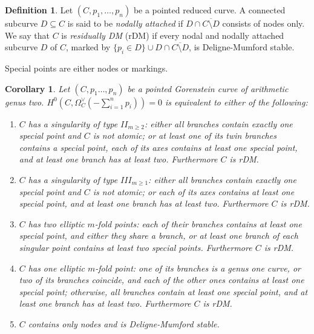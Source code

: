 \documentclass[11pt]{amsart}
\renewcommand{\to}{\rightarrow}
\theoremstyle{plain}
\newtheorem{cor}[thm]{Corollary}
\theoremstyle{definition}
\newtheorem{dfn}[thm]{Definition}
\begin{document}
\begin{dfn}
 Let $(C,p_1,\ldots,p_n)$ be a pointed reduced curve. A connected subcurve $D\subseteq C$ is said to be \emph{nodally attached} if $D\cap\overline{C\setminus D}$ consists of nodes only.
 We say that $C$ is \emph{residually DM} (rDM) if every nodal and nodally attached subcurve $D$ of $C$, marked by $\{p_i\in D\}\cup D\cap\overline{C\setminus D}$, is Deligne-Mumford stable.
\end{dfn}
Special points are either nodes or markings.
\begin{cor}
 Let $(C,p_1\ldots,p_n)$ be a pointed Gorenstein curve of arithmetic genus two. $H^0(C,\Omega_C^\vee(-\sum_{i=1}^n p_i))=0$ is equivalent to either of the following:
 \begin{enumerate}[leftmargin=.6cm]
  \item $C$ has a singularity of type $I\!I_{m\geq 2}$: either all branches contain exactly one special point and $C$ is not atomic; or at least one of its twin branches contains a special point, each of its axes contains at least one special point, and at least one branch has at least two. Furthermore $C$ is rDM.
  \item $C$ has a singularity of type $I\!I\!I_{m\geq 1}$: either all branches contain exactly one special point and $C$ is not atomic; or each of its axes contains at least one special point, and at least one branch has at least two. Furthermore $C$ is rDM.
  \item $C$ has two elliptic $m$-fold points: each of their branches contains at least one special point, and either they share a branch, or at least one branch of each singular point contains at least two special points. Furthermore $C$ is rDM.
  \item $C$ has one elliptic $m$-fold point: one of its branches is a genus one curve, or two of its branches coincide, and each of the other ones contains at least one special point; otherwise, all branches contain at least one special point, and at least one branch has at least two. Furthermore $C$ is rDM.
  \item $C$ contains only nodes and is Deligne-Mumford stable.
 \end{enumerate}
\end{cor}
\end{document}
